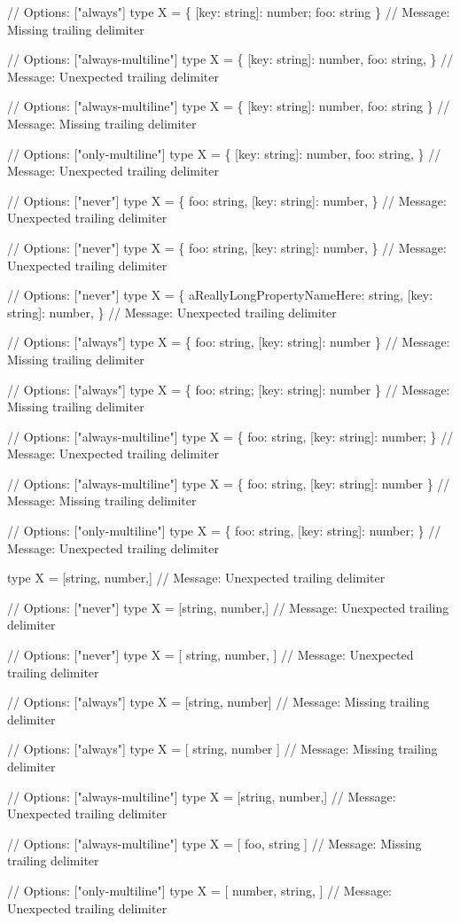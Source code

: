 \begin{DoxyCode}
// Options: ["always"]
type X = \{
[key: string]: number;
foo: string
\}
// Message: Missing trailing delimiter

// Options: ["always-multiline"]
type X = \{ [key: string]: number, foo: string, \}
// Message: Unexpected trailing delimiter

// Options: ["always-multiline"]
type X = \{
[key: string]: number,
foo: string
\}
// Message: Missing trailing delimiter

// Options: ["only-multiline"]
type X = \{ [key: string]: number, foo: string, \}
// Message: Unexpected trailing delimiter

// Options: ["never"]
type X = \{ foo: string, [key: string]: number, \}
// Message: Unexpected trailing delimiter

// Options: ["never"]
type X = \{
foo: string,
[key: string]: number,
\}
// Message: Unexpected trailing delimiter

// Options: ["never"]
type X = \{
aReallyLongPropertyNameHere: string,
[key: string]: number,
\}
// Message: Unexpected trailing delimiter

// Options: ["always"]
type X = \{ foo: string, [key: string]: number \}
// Message: Missing trailing delimiter

// Options: ["always"]
type X = \{ foo: string; [key: string]: number \}
// Message: Missing trailing delimiter

// Options: ["always-multiline"]
type X = \{ foo: string, [key: string]: number; \}
// Message: Unexpected trailing delimiter

// Options: ["always-multiline"]
type X = \{
foo: string,
[key: string]: number
\}
// Message: Missing trailing delimiter

// Options: ["only-multiline"]
type X = \{ foo: string, [key: string]: number; \}
// Message: Unexpected trailing delimiter

type X = [string, number,]
// Message: Unexpected trailing delimiter

// Options: ["never"]
type X = [string, number,]
// Message: Unexpected trailing delimiter

// Options: ["never"]
type X = [
string,
number,
]
// Message: Unexpected trailing delimiter

// Options: ["always"]
type X = [string, number]
// Message: Missing trailing delimiter

// Options: ["always"]
type X = [
string,
number
]
// Message: Missing trailing delimiter

// Options: ["always-multiline"]
type X = [string, number,]
// Message: Unexpected trailing delimiter

// Options: ["always-multiline"]
type X = [
foo, string
]
// Message: Missing trailing delimiter

// Options: ["only-multiline"]
type X = [ number, string, ]
// Message: Unexpected trailing delimiter
\end{DoxyCode}


